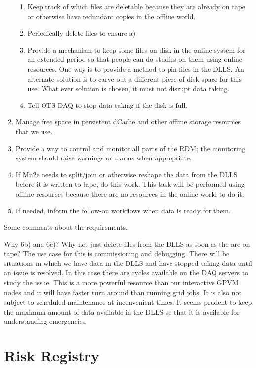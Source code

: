 \begin{enumerate}
\begin{enumerate}
   \item Keep track of which files are deletable because they are already on tape or otherwise have redundant copies in the offline world.
   \item Periodically delete files to ensure a)
   \item Provide a mechanism to keep some files on disk in the online system for an extended period so that
     people can do studies on them using online resources. One way is to provide
     a method to pin files in the DLLS.  An alternate solution is to carve out a different piece of disk
     space for this use.
     What ever solution is chosen, it must not disrupt data taking.
   \item Tell OTS DAQ to stop data taking if the disk is full.
  \end{enumerate}
\item Manage free space in persistent dCache and other offline storage resources that we use.
\item Provide a way to control and monitor all parts of the RDM; the monitoring system should raise warnings or alarms when appropriate.
\item If Mu2e needs to split/join or otherwise reshape the data from the DLLS before it is written to tape, do this work.
  This task will be performed using offline resources because there are no resources in the online world to do it.
\item If needed, inform the follow-on workflows when data is ready for them.
\end{enumerate}

Some comments about the requirements.

Why 6b) and 6c)?
Why not just delete files from the DLLS as soon as the are on tape?
The use case for this is commissioning and debugging.
There will be situations in which we have data in the DLLS and have stopped taking data
until an issue is resolved.
In this case there are cycles available on the DAQ servers to study the issue.
This is a more powerful resource than our interactive GPVM nodes and
it will have faster turn around than running grid jobs.
It is also not subject to scheduled maintenance at inconvenient times.
It seems prudent to keep the maximum amount of data available in the DLLS so that
it is available for understanding emergencies.


\chapter{Risk Registry}
\label{ch:RiskRegistry}

